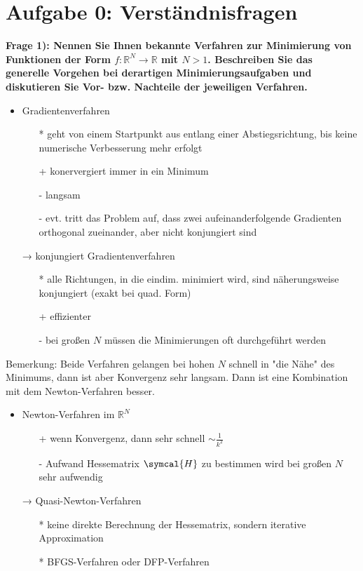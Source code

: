\section*{Aufgabe 0: Verständnisfragen}

\textbf{Frage 1): Nennen Sie Ihnen bekannte Verfahren zur Minimierung von Funktionen der Form $f: \mathbb{R}^N \to \mathbb{R}$
mit $N>1$. Beschreiben Sie das generelle Vorgehen bei derartigen Minimierungsaufgaben und
diskutieren Sie Vor- bzw. Nachteile der jeweiligen Verfahren.} \\
\begin{itemize}
  \item Gradientenverfahren
    \begin{itemize}
      \item[*] geht von einem Startpunkt aus entlang einer Abstiegsrichtung, bis keine numerische Verbesserung mehr erfolgt
      \item[+] konervergiert immer in ein Minimum
      \item[-] langsam
      \item[-] evt. tritt das Problem auf, dass zwei aufeinanderfolgende Gradienten orthogonal zueinander, aber nicht konjungiert sind
    \end{itemize}
  \item[→] konjungiert Gradientenverfahren
    \begin{itemize}
      \item[*]alle Richtungen, in die eindim. minimiert wird, sind näherungsweise konjungiert (exakt bei quad. Form)
      \item[+] effizienter
      \item[-] bei großen $N$ müssen die Minimierungen oft durchgeführt werden
    \end{itemize}
\end{itemize}
Bemerkung: Beide Verfahren gelangen bei hohen $N$ schnell in "die Nähe" des Minimums, dann ist aber Konvergenz sehr langsam. Dann ist eine Kombination mit dem Newton-Verfahren besser.
\begin{itemize}
  \item Newton-Verfahren im $\mathbb{R}^N$
  \begin{itemize}
    \item[+] wenn Konvergenz, dann sehr schnell $\sim\frac{1}{k^2}$
    \item[-] Aufwand Hessematrix $\symcal{H}$ zu bestimmen wird bei großen $N$ sehr aufwendig
  \end{itemize}
  \item[→] Quasi-Newton-Verfahren
  \begin{itemize}
    \item[*] keine direkte Berechnung der Hessematrix, sondern iterative Approximation
    \item[*] BFGS-Verfahren oder DFP-Verfahren
  \end{itemize}
\end{itemize}

